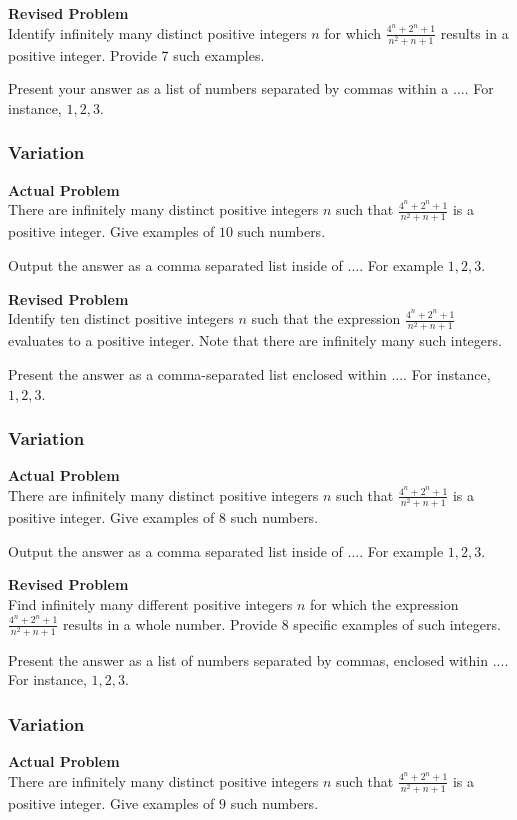 \textbf{Revised Problem}\\
Identify infinitely many distinct positive integers \( n \) for which \(\frac{4^n + 2^n + 1}{n^2 + n + 1}\) results in a positive integer. Provide 7 such examples.

Present your answer as a list of numbers separated by commas within a \(\boxed{...}\). For instance, \(\boxed{1, 2, 3}\).

\subsubsection{Variation}
\textbf{Actual Problem}\\
There are infinitely many distinct positive integers $n$ such that $\frac{4^n+2^n+1}{n^2 + n + 1}$ is a positive integer. Give examples of $10$ such numbers.

Output the answer as a comma separated list inside of $\boxed{...}$. For example $\boxed{1, 2, 3}$.

\textbf{Revised Problem}\\
Identify ten distinct positive integers \( n \) such that the expression \(\frac{4^n + 2^n + 1}{n^2 + n + 1}\) evaluates to a positive integer. Note that there are infinitely many such integers.

Present the answer as a comma-separated list enclosed within \(\boxed{...}\). For instance, \(\boxed{1, 2, 3}\).

\subsubsection{Variation}
\textbf{Actual Problem}\\
There are infinitely many distinct positive integers $n$ such that $\frac{4^n+2^n+1}{n^2 + n + 1}$ is a positive integer. Give examples of $8$ such numbers.

Output the answer as a comma separated list inside of $\boxed{...}$. For example $\boxed{1, 2, 3}$.

\textbf{Revised Problem}\\
Find infinitely many different positive integers \( n \) for which the expression \(\frac{4^n + 2^n + 1}{n^2 + n + 1}\) results in a whole number. Provide 8 specific examples of such integers.

Present the answer as a list of numbers separated by commas, enclosed within \(\boxed{...}\). For instance, \(\boxed{1, 2, 3}\).

\subsubsection{Variation}
\textbf{Actual Problem}\\
There are infinitely many distinct positive integers $n$ such that $\frac{4^n+2^n+1}{n^2 + n + 1}$ is a positive integer. Give examples of $9$ such numbers.

